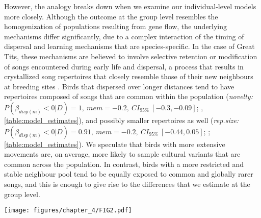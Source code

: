 However, the analogy breaks down when we examine our individual-level models more closely. Although the outcome at the group level resembles the homogenization of populations resulting from gene flow, the underlying mechanisms differ significantly, due to a complex interaction of the timing of dispersal and learning mechanisms that are species-specific. In the case of Great Tits, these mechanisms are believed to involve selective retention or modification of songs encountered during early life and dispersal, a process that results in crystallized song repertoires that closely resemble those of their new neighbours at breeding sites \parencite{marler1982, peters2017, nelson1992}. Birds that dispersed over longer distances tend to have repertoires composed of songs that are common within the population (\textit{novelty:} $P(\beta_{disp (m)} < 0 | D) = 1,~mem = -0.2,~CI_{95\%}~[-0.3, -0.09]$; , \autoref{table:model_estimates}), and possibly smaller repertoires as well (\textit{rep.size:} $P(\beta_{disp (m)} < 0 | D) = 0.91,~mem = -0.2,~CI_{95\%}~[-0.44, 0.05]$; ; \autoref{table:model_estimates}). We speculate that birds with more extensive movements are, on average, more likely to sample cultural variants that are common across the population. In contrast, birds with a more restricted and stable neighbour pool tend to be equally exposed to common and globally rarer songs, and this is enough to give rise to the differences that we estimate at the group level.



\begin{figure*}[]
    \centering
    \texttt{[image: figures/chapter\_4/FIG2.pdf]}
    \label{c4_fig:individual}
\end{figure*}

